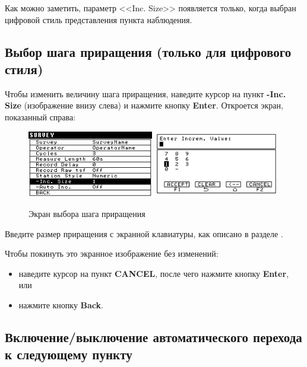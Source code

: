 Как можно заметить, параметр <<Inc. Size>> появляется только, когда выбран
цифровой стиль представления пункта наблюдения.

\subsection{Выбор шага приращения (только для цифрового стиля)}

Чтобы изменить величину шага приращения, наведите курсор на пункт \textbf{-Inc.
  Size} (изображение внизу слева) и нажмите кнопку \textbf{Enter}. Откроется
экран, показанный справа:

\begin{figure}[H]
  \centering
  \includegraphics[width=0.49\textwidth]{figures/the_increment_size_screen_1}
  \includegraphics[width=0.49\textwidth]{figures/the_increment_size_screen_2}
  \caption{Экран выбора шага приращения}
  \label{fig:the_increment_size_screen}
\end{figure}

Введите размер приращения с экранной клавиатуры, как описано в разделе
.

Чтобы покинуть это экранное изображение без изменений:
\begin{itemize}
  \item наведите курсор на пункт \textbf{CANCEL}, после чего нажмите кнопку
    \textbf{Enter}, или

  \item нажмите кнопку \textbf{Back}.
\end{itemize}

\subsection{Включение/выключение автоматического перехода к следующему пункту}

